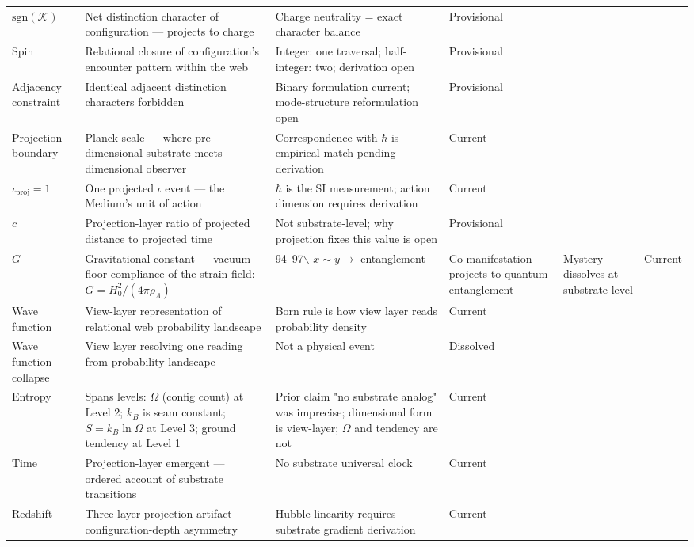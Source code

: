 \documentclass[11pt,letterpaper]{article}
\newcommand{\Kappa}{\mathcal{K}}
\begin{document}
\begin{table}[htbp]
\begin{tabular}{llp{4.5cm}l}
\(\mathrm{sgn}(\Kappa)\) & Net distinction character of configuration --- projects to charge & Charge neutrality = exact character balance & Provisional\\[0pt]
Spin & Relational closure of configuration's encounter pattern within the web & Integer: one traversal; half-integer: two; derivation open & Provisional\\[0pt]
Adjacency constraint & Identical adjacent distinction characters forbidden & Binary formulation current; mode-structure reformulation open & Provisional\\[0pt]
Projection boundary & Planck scale --- where pre-dimensional substrate meets dimensional observer & Correspondence with \(\hbar\) is empirical match pending derivation & Current\\[0pt]
\(\iota_{\mathrm{proj}} = 1\) & One projected \(\iota\) event --- the Medium's unit of action & \(\hbar\) is the SI measurement; action dimension requires derivation & Current\\[0pt]
\(c\) & Projection-layer ratio of projected distance to projected time & Not substrate-level; why projection fixes this value is open & Provisional\\[0pt]
\(G\) & Gravitational constant --- vacuum-floor compliance of the strain field: \(G = H_0^2/(4\pi\rho_\Lambda)\) & 94--97$\backslash$%
\(x \sim y \to\) entanglement & Co-manifestation projects to quantum entanglement & Mystery dissolves at substrate level & Current\\[0pt]
Wave function & View-layer representation of relational web probability landscape & Born rule is how view layer reads probability density & Current\\[0pt]
Wave function collapse & View layer resolving one reading from probability landscape & Not a physical event & Dissolved\\[0pt]
Entropy & Spans levels: \(\Omega\) (config count) at Level 2; \(k_B\) is seam constant; \(S = k_B\ln\Omega\) at Level 3; ground tendency at Level 1 & Prior claim "no substrate analog" was imprecise; dimensional form is view-layer; \(\Omega\) and tendency are not & Current\\[0pt]
Time & Projection-layer emergent --- ordered account of substrate transitions & No substrate universal clock & Current\\[0pt]
Redshift & Three-layer projection artifact --- configuration-depth asymmetry & Hubble linearity requires substrate gradient derivation & Current\\[0pt]

\end{tabular}
\end{table}
\end{document}
